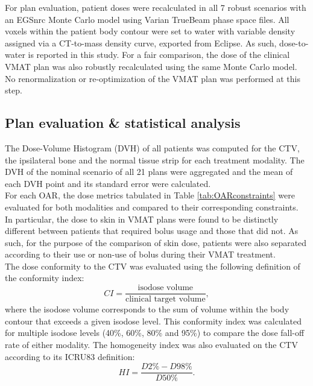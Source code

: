 \documentclass[aapm,graphicx,superscriptaddress]{revtex4-1}
\begin{document}
For plan evaluation, patient doses were recalculated in all 7 robust scenarios with an EGSnrc \cite{egsnrc} Monte Carlo model using Varian TrueBeam phase space files. All voxels within the patient body contour were set to water with variable density assigned via a CT-to-mass density curve, exported from Eclipse. As such, dose-to-water is reported in this study. For a fair comparison, the dose of the clinical VMAT plan was also robustly recalculated using the same Monte Carlo model. No renormalization or re-optimization of the VMAT plan was performed at this step.\\

\subsection{Plan evaluation \& statistical analysis}
The Dose-Volume Histogram (DVH) of all patients was computed for the CTV, the ipsilateral bone and the normal tissue strip for each treatment modality. The DVH of the nominal scenario of all 21 plans were aggregated and the mean of each DVH point and its standard error were calculated.\\
For each OAR, the dose metrics tabulated in Table \ref{tab:OARconstraints} were evaluated for both modalities and compared to their corresponding constraints. %
In particular, the dose to skin in VMAT plans were found to be distinctly different between patients that required bolus usage and those that did not. As such, for the purpose of the comparison of skin dose, patients were also separated according to their use or non-use of bolus during their VMAT treatment.\\
The dose conformity to the CTV was evaluated using the following definition of the conformity index:
\begin{equation}
    CI = \frac{\text{isodose volume}}{\text{clinical target volume}},
\end{equation}
where the isodose volume corresponds to the sum of volume within the body contour that exceeds a given isodose level. This conformity index was calculated for multiple isodose levels (40\%, 60\%, 80\% and 95\%) to compare the dose fall-off rate of either modality. The homogeneity index was also evaluated on the CTV according to its ICRU83 \cite{ICRU83} definition:
\begin{equation}
    HI = \frac{D2\% - D98\%}{D50\%}.
\end{equation}\\
\end{document}
